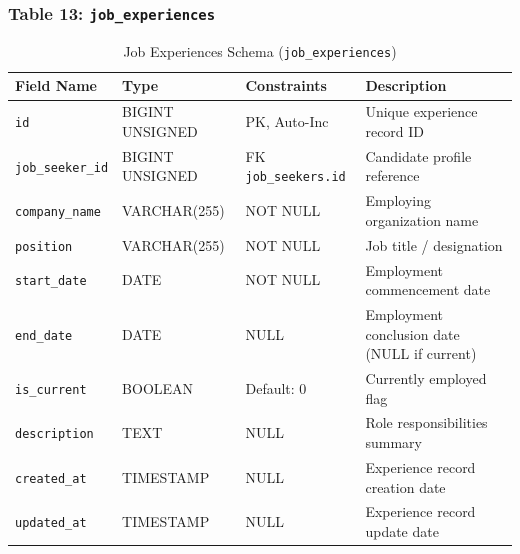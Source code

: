 \subsubsection{Table 13: \texttt{job\_experiences}}
\begin{table}[H]
\centering
\small
\caption{Job Experiences Schema (\texttt{job\_experiences})}
\label{tab:schema_job_experiences}
\begin{tabular}{|p{3cm}|p{2.8cm}|p{2.2cm}|p{5.5cm}|}
\hline
\textbf{Field Name} & \textbf{Type} & \textbf{Constraints} & \textbf{Description} \\ \hline
\texttt{id} & BIGINT UNSIGNED & PK, Auto-Inc & Unique experience record ID \\ \hline
\texttt{job\_seeker\_id} & BIGINT UNSIGNED & FK \texttt{job\_seekers.id} & Candidate profile reference \\ \hline
\texttt{company\_name} & VARCHAR(255) & NOT NULL & Employing organization name \\ \hline
\texttt{position} & VARCHAR(255) & NOT NULL & Job title / designation \\ \hline
\texttt{start\_date} & DATE & NOT NULL & Employment commencement date \\ \hline
\texttt{end\_date} & DATE & NULL & Employment conclusion date (NULL if current) \\ \hline
\texttt{is\_current} & BOOLEAN & Default: 0 & Currently employed flag \\ \hline
\texttt{description} & TEXT & NULL & Role responsibilities summary \\ \hline
\texttt{created\_at} & TIMESTAMP & NULL & Experience record creation date \\ \hline
\texttt{updated\_at} & TIMESTAMP & NULL & Experience record update date \\ \hline
\end{tabular}
\end{table}

